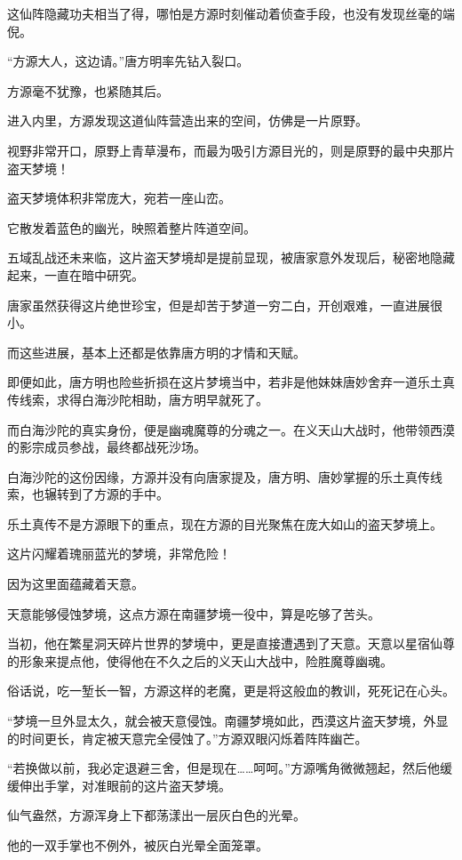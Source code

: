 \begin{this_body}
这仙阵隐藏功夫相当了得，哪怕是方源时刻催动着侦查手段，也没有发现丝毫的端倪。

“方源大人，这边请。”唐方明率先钻入裂口。

方源毫不犹豫，也紧随其后。

进入内里，方源发现这道仙阵营造出来的空间，仿佛是一片原野。

视野非常开口，原野上青草漫布，而最为吸引方源目光的，则是原野的最中央那片盗天梦境！

盗天梦境体积非常庞大，宛若一座山峦。

它散发着蓝色的幽光，映照着整片阵道空间。

五域乱战还未来临，这片盗天梦境却是提前显现，被唐家意外发现后，秘密地隐藏起来，一直在暗中研究。

唐家虽然获得这片绝世珍宝，但是却苦于梦道一穷二白，开创艰难，一直进展很小。

而这些进展，基本上还都是依靠唐方明的才情和天赋。

即便如此，唐方明也险些折损在这片梦境当中，若非是他妹妹唐妙舍弃一道乐土真传线索，求得白海沙陀相助，唐方明早就死了。

而白海沙陀的真实身份，便是幽魂魔尊的分魂之一。在义天山大战时，他带领西漠的影宗成员参战，最终都战死沙场。

白海沙陀的这份因缘，方源并没有向唐家提及，唐方明、唐妙掌握的乐土真传线索，也辗转到了方源的手中。

乐土真传不是方源眼下的重点，现在方源的目光聚焦在庞大如山的盗天梦境上。

这片闪耀着瑰丽蓝光的梦境，非常危险！

因为这里面蕴藏着天意。

天意能够侵蚀梦境，这点方源在南疆梦境一役中，算是吃够了苦头。

当初，他在繁星洞天碎片世界的梦境中，更是直接遭遇到了天意。天意以星宿仙尊的形象来提点他，使得他在不久之后的义天山大战中，险胜魔尊幽魂。

俗话说，吃一堑长一智，方源这样的老魔，更是将这般血的教训，死死记在心头。

“梦境一旦外显太久，就会被天意侵蚀。南疆梦境如此，西漠这片盗天梦境，外显的时间更长，肯定被天意完全侵蚀了。”方源双眼闪烁着阵阵幽芒。

“若换做以前，我必定退避三舍，但是现在……呵呵。”方源嘴角微微翘起，然后他缓缓伸出手掌，对准眼前的这片盗天梦境。

仙气盎然，方源浑身上下都荡漾出一层灰白色的光晕。

他的一双手掌也不例外，被灰白光晕全面笼罩。


\end{this_body}
